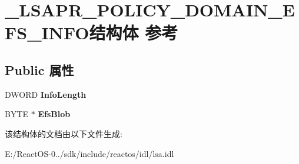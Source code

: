 \hypertarget{struct___l_s_a_p_r___p_o_l_i_c_y___d_o_m_a_i_n___e_f_s___i_n_f_o}{}\section{\+\_\+\+L\+S\+A\+P\+R\+\_\+\+P\+O\+L\+I\+C\+Y\+\_\+\+D\+O\+M\+A\+I\+N\+\_\+\+E\+F\+S\+\_\+\+I\+N\+F\+O结构体 参考}
\label{struct___l_s_a_p_r___p_o_l_i_c_y___d_o_m_a_i_n___e_f_s___i_n_f_o}
\subsection*{Public 属性}
\begin{DoxyCompactItemize}
\item 
\mbox{\label{struct___l_s_a_p_r___p_o_l_i_c_y___d_o_m_a_i_n___e_f_s___i_n_f_o_a533c24f2af24c35095ef474d3e9482c4}} 
D\+W\+O\+RD {\bfseries Info\+Length}
\item 
\mbox{\label{struct___l_s_a_p_r___p_o_l_i_c_y___d_o_m_a_i_n___e_f_s___i_n_f_o_a1be83505249af94f1814e1db15cf908b}} 
B\+Y\+TE $\ast$ {\bfseries Efs\+Blob}
\end{DoxyCompactItemize}


该结构体的文档由以下文件生成\+:\begin{DoxyCompactItemize}
\item 
E\+:/\+React\+O\+S-\/0../sdk/include/reactos/idl/lsa.\+idl\end{DoxyCompactItemize}
